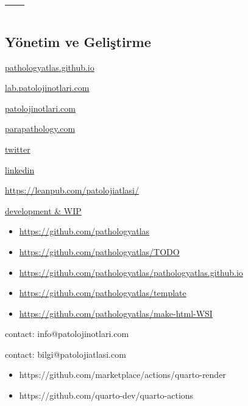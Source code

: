 \documentclass[
  letterpaper,
  DIV=11,
  numbers=noendperiod]{scrreprt}
\newlength{\cslhangindent}
\newlength{\cslentryspacingunit} %
\newenvironment{CSLReferences}[2] %
 {%
  \setlength{\parindent}{0pt}
  \ifodd #1
  \let\oldpar\par
  \def\par{\hangindent=\cslhangindent\oldpar}
  \fi
  \setlength{\parskip}{#2\cslentryspacingunit}
 }%
 {}
\begin{document}
\hypertarget{refs}{}
\begin{CSLReferences}{0}{0}
\end{CSLReferences}

\part{---}

\appendix
{}

\hypertarget{yuxf6netim-ve-geliux15ftirme}{%
\chapter{Yönetim ve Geliştirme}\label{yuxf6netim-ve-geliux15ftirme}}

\href{https://pathologyatlas.github.io/}{pathologyatlas.github.io}

\href{https://lab.patolojinotlari.com}{lab.patolojinotlari.com}

\href{https://patolojinotlari.com}{patolojinotlari.com}

\href{https://parapathology.com}{parapathology.com}

\href{https://twitter.com/patolojinotlari}{twitter}

\href{https://www.linkedin.com/company/patoloji-notlari}{linkedin}

\url{https://leanpub.com/patolojiatlasi/}

\href{https://pathologyatlas.github.io/development.md}{development \&
WIP}

\begin{itemize}
\item
  \url{https://github.com/pathologyatlas}
\item
  \url{https://github.com/pathologyatlas/TODO}
\item
  \url{https://github.com/pathologyatlas/pathologyatlas.github.io}
\item
  \url{https://github.com/pathologyatlas/template}
\item
  \url{https://github.com/pathologyatlas/make-html-WSI}
\end{itemize}

contact: info@patolojinotlari.com

contact: bilgi@patolojiatlasi.com

\begin{itemize}
\item
  https://github.com/marketplace/actions/quarto-render
\item
  https://github.com/quarto-dev/quarto-actions
\end{itemize}
\end{document}

